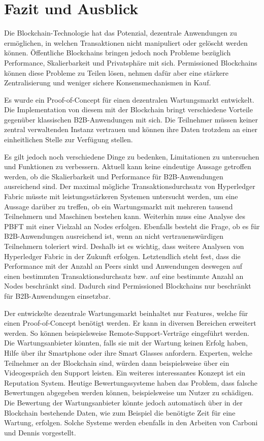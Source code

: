\chapter{Fazit und Ausblick}
\label{cha:fazit}

Die Blockchain-Technologie hat das Potenzial, dezentrale Anwendungen zu ermöglichen, in welchen Transaktionen nicht manipuliert oder gelöscht werden können. Öffentliche Blockchains bringen jedoch noch Probleme bezüglich Performance, Skalierbarkeit und Privatsphäre mit sich. Permissioned Blockchains können diese Probleme zu Teilen lösen, nehmen dafür aber eine stärkere Zentralisierung und weniger sichere Konsensmechanismen in Kauf. 

Es wurde ein Proof-of-Concept für einen dezentralen Wartungsmarkt entwickelt. Die Implementation von diesem mit der Blockchain bringt verschiedene Vorteile gegenüber klassischen \acs{B2B}-Anwendungen mit sich. Die Teilnehmer müssen keiner zentral verwaltenden Instanz vertrauen und können ihre Daten trotzdem an einer einheitlichen Stelle zur Verfügung stellen. 

Es gilt jedoch noch verschiedene Dinge zu bedenken, Limitationen zu untersuchen und Funktionen zu verbessern. Aktuell kann keine eindeutige Aussage getroffen werden, ob die Skalierbarkeit und Performance für \acs{B2B}-Anwendungen ausreichend sind. Der maximal mögliche Transaktionsdurchsatz von Hyperledger Fabric müsste mit leistungsstärkeren Systemen untersucht werden, um eine Aussage darüber zu treffen, ob ein Wartungsmarkt mit mehreren tausend Teilnehmern und Maschinen bestehen kann. Weiterhin muss eine Analyse des \acs{PBFT} mit einer Vielzahl an Nodes erfolgen. Ebenfalls besteht die Frage, ob es für \acs{B2B}-Anwendungen ausreichend ist, wenn  an nicht vertrauenswürdigen Teilnehmern toleriert wird. Deshalb ist es wichtig, dass weitere Analysen von Hyperledger Fabric in der Zukunft erfolgen. Letztendlich steht fest, dass die Performance mit der Anzahl an Peers sinkt und Anwendungen deswegen auf einen bestimmten Transaktionsdurchsatz bzw. auf eine bestimmte Anzahl an Nodes beschränkt sind. Dadurch sind Permissioned Blockchains nur beschränkt für \acs{B2B}-Anwendungen einsetzbar.

Der entwickelte dezentrale Wartungsmarkt beinhaltet nur Features, welche für einen Proof-of-Concept benötigt werden. Er kann in diversen Bereichen erweitert werden. So können beispielsweise Remote-Support-Verträge eingeführt werden. Die Wartungsanbieter könnten, falls sie mit der Wartung keinen Erfolg haben, Hilfe über ihr Smartphone oder ihre Smart Glasses anfordern. Experten, welche Teilnehmer an der Blockchain sind, würden dann beispielsweise über ein Videogespräch den Support leisten. Ein weiteres interessantes Konzept ist ein Reputation System. Heutige Bewertungssysteme haben das Problem, dass falsche Bewertungen abgegeben werden können, beispielsweise um Nutzer zu schädigen. Die Bewertung der Wartungsanbieter könnte jedoch automatisch über in der Blockchain bestehende Daten, wie zum Beispiel die benötigte Zeit für eine Wartung, erfolgen. Solche Systeme werden ebenfalls in den Arbeiten von Carboni \cite{CarboniFeedbackbasedReputation2015} und Dennis \cite{DennisRepblocknext2015} vorgestellt.

